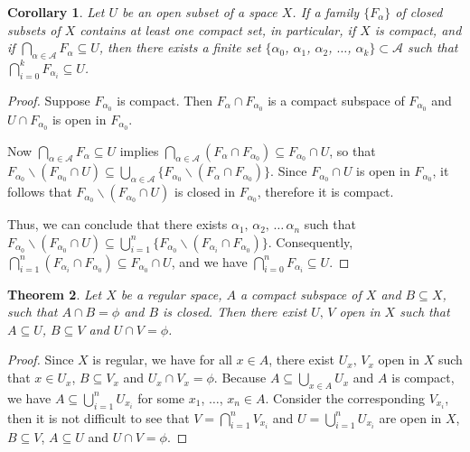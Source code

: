 \documentclass[12pt,oneside,english]{amsbook}
\numberwithin{equation}{section} %
\numberwithin{figure}{section} %
\theoremstyle{plain}
\numberwithin{section}{chapter}
\newtheorem{thm}{Theorem}[section]
\theoremstyle{plain}
\newtheorem{corollary}[thm]{Corollary}
\begin{document}
\begin{corollary}
  Let $U$ be an open subset of a space $X$. If a family $\{F_{\alpha} \}$ of closed subsets of $X$ contains at least one compact set, in particular, if $X$ is compact, and if $\bigcap_{\alpha  \in  \mathcal{A}} F_{\alpha}  \subseteq  U$, then there exists a finite set $\{\alpha_0$, $\alpha_{1}$, $\alpha_{2}$, $\ldots$, $\alpha_{k}\} \subset \mathcal{A}$ such that $\bigcap_{i  =  0}^{k} F_{\alpha_i}  \subseteq  U$.
\end{corollary}
\begin{proof}
  Suppose $F_{\alpha_{0}}$ is compact.%
   Then $F_{\alpha} \cap F_{\alpha_{0}}$ is a compact subspace of $F_{\alpha_{0}}$ and $U \cap F_{\alpha_{0}}$ is open in $F_{\alpha_{0}}$.

  Now $\bigcap_{\alpha  \in  \mathcal{A}} F_{\alpha}  \subseteq  U$ implies $\bigcap_{\alpha  \in  \mathcal{A}}(F_{\alpha} \cap F_{\alpha_{0}})  \subseteq  F_{\alpha_{0}} \cap U$, so that $F_{\alpha_{0}} \backslash (F_{\alpha_{0}} \cap U)  \subseteq  \bigcup_{\alpha  \in  \mathcal{A}}\{F_{\alpha_{0}} \backslash (F_{\alpha} \cap F_{\alpha_{0}}) \}$. Since $F_{\alpha_{0}} \cap U$ is open in $F_{\alpha_0}$, it follows that  $F_{\alpha_{0}} \backslash (F_{\alpha_{0}} \cap U)$ is closed in $F_{\alpha_0}$, therefore it is compact.

  Thus, we can conclude that there exists $\alpha_{1}, \, \alpha_{2}, \, \ldots \, \alpha_{n}$ such that $F_{\alpha_{0}} \backslash (F_{\alpha_{0}} \cap U) \subseteq  \bigcup_{i  =  1}^{n} \{F_{\alpha_{0}} \backslash (F_{\alpha_{i}} \cap F_{\alpha_{0}}) \}$. Consequently, $\bigcap_{i  =  1}^{n} (F_{\alpha_{i}} \cap F_{\alpha_{0}})  \subseteq  F_{\alpha_{0}} \cap U$, and we have $\bigcap_{i  =  0}^{n} F_{\alpha_{i}}  \subseteq  U$.
\end{proof}

\begin{thm}
  Let $X$ be a regular space, $A$ a compact subspace of $X$ and $B  \subseteq  X$, such that $A \cap B =  \phi$ and $B$ is closed. Then there exist $U, \, V$ open in $X$ such that $A  \subseteq  U$, $B  \subseteq  V$ and $U \cap V  =  \phi$. 
\end{thm}
\begin{proof}
  Since $X$ is regular, we have for all $x  \in  A$, there exist $U_{x}, \, V_{x}$ open in $X$ such that $x  \in  U_{x}$, $B  \subseteq  V_{x}$ and $U_{x} \cap V_{x}  =  \phi$. Because $A  \subseteq  \bigcup_{x  \in  A}U_{x}$ and $A$ is compact, we have $A  \subseteq  \bigcup_{i  =  1}^{n}U_{x_{i}}$ for some $x_1$, $\ldots$, $x_n \in A$. Consider the corresponding $V_{x_{i}}$, then it is not difficult to see that $V = \bigcap_{i = 1}^n V_{x_i}$ and $U = \bigcup_{i = 1}^n U_{x_i}$ are open in $X$, $B \subseteq V$, $A \subseteq U$ and $U \cap V = \phi$.
\end{proof}
\end{document}
